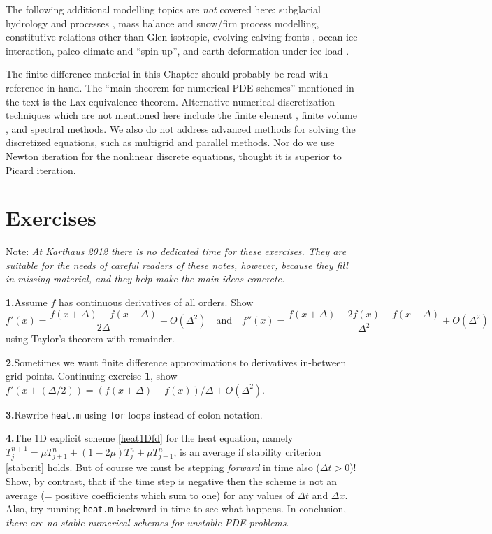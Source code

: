 \documentclass[titlepage,a4paper,final,12pt]{scrartcl}
\begin{document}
The following additional modelling topics are \emph{not} covered here: subglacial hydrology and processes \cite{Clarke05}, mass balance and snow/firn process modelling, constitutive relations other than Glen isotropic, evolving calving fronts \cite{Albrechtetal2011}, ocean-ice interaction, paleo-climate and ``spin-up'', and earth deformation under ice load \cite{Peltier1998review}.

The finite difference material in this Chapter should probably be read with reference \cite{MortonMayers} in hand.  The ``main theorem for numerical PDE schemes'' mentioned in the text is the Lax equivalence theorem.  Alternative numerical discretization techniques which are not mentioned here include the finite element \cite{Braess}, finite volume \cite{LeVeque}, and spectral \cite{Trefethen} methods.  We also do not address advanced methods for solving the discretized equations, such as multigrid and parallel methods.  Nor do we use Newton iteration \cite{Kelley} for the nonlinear discrete equations, thought it is superior to Picard iteration.


\footnotesize




\clearpage\newpage
\small
\section*{Exercises}

\newcommand{\exer}[2]{\medskip\noindent \textbf{#1.}\quad #2}

Note:  \emph{At Karthaus 2012 there is no dedicated time for these exercises.  They are suitable for the needs of careful readers of these notes, however, because they fill in missing material, and they help make the main ideas concrete.}


\exer{1}{Assume $f$ has continuous derivatives of all orders.  Show
  $$f'(x) = \frac{f(x+\Delta) - f(x-\Delta)}{2\Delta} + O(\Delta^2) \quad \text{and} \quad f''(x) = \frac{f(x+\Delta) - 2 f(x) + f(x-\Delta)}{\Delta^2} + O(\Delta^2)$$
using Taylor's theorem with remainder.}

\exer{2}{Sometimes we want finite difference approximations to derivatives in-between grid points.  Continuing exercise \textbf{1}, show $f'(x+(\Delta/2)) = (f(x+\Delta) - f(x))/\Delta + O(\Delta^2)$.}

\exer{3}{Rewrite \texttt{heat.m} using \texttt{for} loops instead of colon notation.}

\exer{4}{The 1D explicit scheme \eqref{heat1Dfd} for the heat equation, namely $T_j^{n+1} = \mu T_{j+1}^n + (1 - 2 \mu) T_j^n + \mu T_{j-1}^n$, is an average if stability criterion \eqref{stabcrit} holds.  But of course we must be stepping \emph{forward} in time also ($\Delta t>0$)!  Show, by contrast, that if the time step is negative then the scheme is not an average (= positive coefficients which sum to one) for any values of $\Delta t$ and $\Delta x$.  Also, try running \texttt{heat.m} backward in time to see what happens.  In conclusion, \emph{there are no stable numerical schemes for unstable PDE problems}.}
\end{document}
